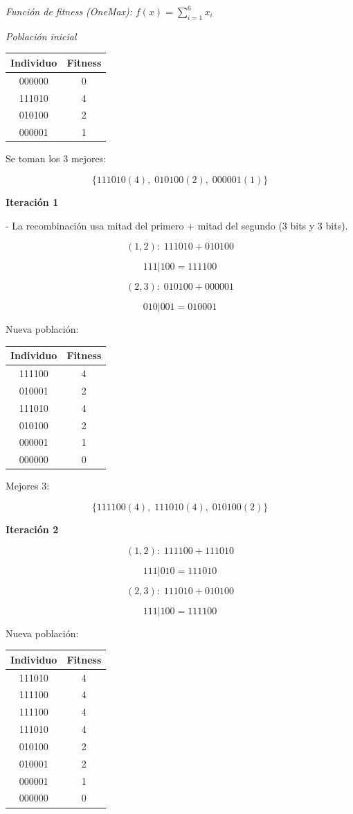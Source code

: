 \textit{Función de fitness (OneMax):} $f(x)=\sum_{i=1}^{6} x_i$

\textit{Población inicial}

\begin{center}
\begin{tabular}{c|c}
Individuo & Fitness \\
\hline
000000 & 0 \\
111010 & 4 \\
010100 & 2 \\
000001 & 1 \\
\end{tabular}
\end{center}

Se toman los 3 mejores:

\[
\{111010(4),\;010100(2),\;000001(1)\}
\]


\bigskip
\textbf{Iteración 1}

- La recombinación usa mitad del primero + mitad del segundo (3 bits y 3 bits).

\[
(1,2):\;111010 + 010100
\]

\[
111|100 = 111100
\]

\[
(2,3):\;010100 + 000001
\]

\[
010|001 = 010001
\]

Nueva población:

\begin{center}
\begin{tabular}{c|c}
Individuo & Fitness \\
\hline
111100 & 4 \\
010001 & 2 \\
111010 & 4 \\
010100 & 2 \\
000001 & 1 \\
000000 & 0 \\
\end{tabular}
\end{center}

Mejores 3:

\[
\{111100(4),\;111010(4),\;010100(2)\}
\]

\bigskip
\textbf{Iteración 2}

\[
(1,2):\;111100 + 111010
\]

\[
111|010 = 111010
\]

\[
(2,3):\;111010 + 010100
\]

\[
111|100 = 111100
\]

Nueva población:

\begin{center}
\begin{tabular}{c|c}
Individuo & Fitness \\
\hline
111010 & 4 \\
111100 & 4 \\
111100 & 4 \\
111010 & 4 \\
010100 & 2 \\
010001 & 2 \\
000001 & 1 \\
000000 & 0 \\
\end{tabular}
\end{center}

